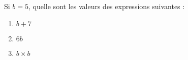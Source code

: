 
\begin{exercice}\label{exo2smath-0072}

    Si \( b=5\), quelle sont les valeurs des expressions suivantes :
    \begin{multicols}{3}
    \begin{enumerate}
        \item
            \( b+7\)
        \item
            \( 6b\)
        \item
            \( b\times b\)
    \end{enumerate}
    \end{multicols}

\end{exercice}
